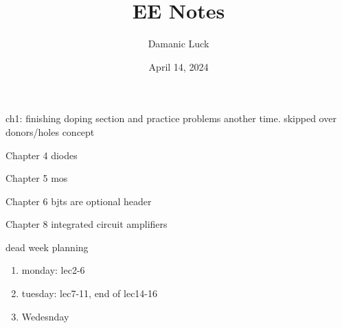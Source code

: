 \documentclass[10pt, openany]{book}
\title{EE Notes}
\author{Damanic Luck}
\date{April 14, 2024}
\begin{document}
\maketitle

\setcounter{chapter}{1}
\tableofcontents


\newpage
\begin{todo}
    \item ch1: finishing doping section and practice problems another time. skipped over donors/holes concept
    \item Chapter 4 diodes
    \item Chapter 5 mos
    \item Chapter 6 bjts are optional header
    \item Chapter 8 integrated circuit amplifiers
    \item dead week planning
    \begin{enumerate}
        \item monday: lec2-6
        \item tuesday: lec7-11, end of lec14-16
        \item Wedesnday
    \end{enumerate}
\end{todo}


\newpage


\newpage

\end{document}
